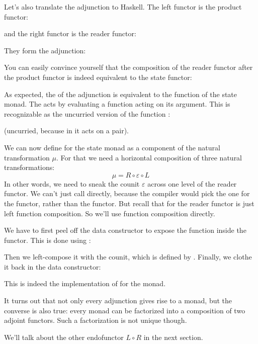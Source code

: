 Let's also translate the adjunction to Haskell. The left functor is the
product functor:

and the right functor is the reader functor:

They form the adjunction:

You can easily convince yourself that the composition of the reader
functor after the product functor is indeed equivalent to the state
functor:

As expected, the  of the adjunction is equivalent to the
 function of the state monad. The  acts by
evaluating a function acting on its argument. This is recognizable as
the uncurried version of the function :

(uncurried, because in  it acts on a pair).

We can now define  for the state monad as a component of
the natural transformation $\mu$. For that we need a horizontal composition
of three natural transformations:
\[\mu = R \circ \varepsilon \circ L\]
In other words, we need to sneak the counit $\varepsilon$ across one level of the
reader functor. We can't just call  directly, because the
compiler would pick the one for the  functor, rather than
the  functor. But recall that  for the
reader functor is just left function composition. So we'll use function
composition directly.

We have to first peel off the data constructor  to expose
the function inside the  functor. This is done using
:

Then we left-compose it with the counit, which is defined by
. Finally, we clothe it back in the
 data constructor:

This is indeed the implementation of  for the
 monad.

It turns out that not only every adjunction gives rise to a monad, but
the converse is also true: every monad can be factorized into a
composition of two adjoint functors. Such a factorization is not unique
though.

We'll talk about the other endofunctor $L \circ R$ in the next
section.

